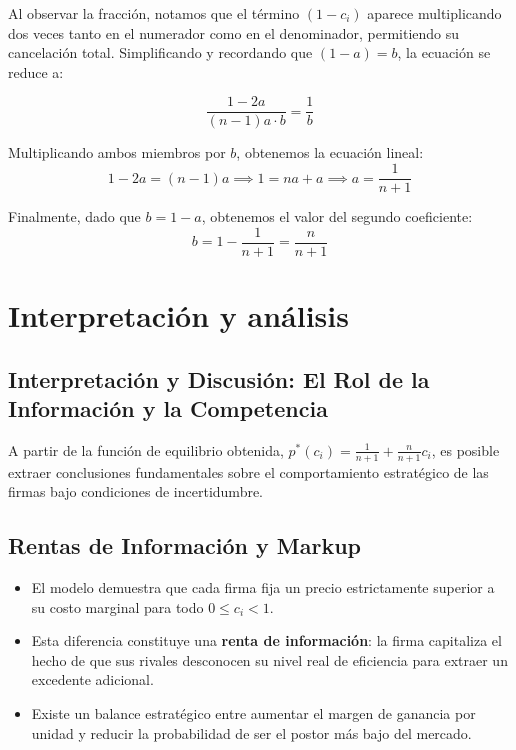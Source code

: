 \documentclass[12pt]{article}
\begin{document}
Al observar la fracción, notamos que el término $(1 - c_i)$ aparece multiplicando dos veces tanto en el numerador como en el denominador, permitiendo su cancelación total. Simplificando y recordando que $(1 - a) = b$, la ecuación se reduce a:

\begin{equation}
    \frac{1 - 2a}{(n - 1)a \cdot b} = \frac{1}{b}
\end{equation}

Multiplicando ambos miembros por $b$, obtenemos la ecuación lineal:
\begin{equation}
    1 - 2a = (n - 1)a \implies 1 = na + a \implies a = \frac{1}{n+1}
\end{equation}

Finalmente, dado que $b = 1 - a$, obtenemos el valor del segundo coeficiente:
\begin{equation}
    b = 1 - \frac{1}{n+1} = \frac{n}{n+1}
\end{equation}
\section{Interpretación y  análisis}
\subsection{Interpretación y Discusión: El Rol de la Información y la Competencia}

A partir de la función de equilibrio obtenida, $p^*(c_i) = \frac{1}{n+1} + \frac{n}{n+1}c_i$, es posible extraer conclusiones fundamentales sobre el comportamiento estratégico de las firmas bajo condiciones de incertidumbre.

\subsection{Rentas de Información y Markup}
\begin{itemize}
    \item El modelo demuestra que cada firma fija un precio estrictamente superior a su costo marginal para todo $0 \le c_i < 1$.
    \item Esta diferencia constituye una \textbf{renta de información}: la firma capitaliza el hecho de que sus rivales desconocen su nivel real de eficiencia para extraer un excedente adicional.
    \item Existe un balance estratégico entre aumentar el margen de ganancia por unidad y reducir la probabilidad de ser el postor más bajo del mercado.
\end{itemize}
\end{document}
